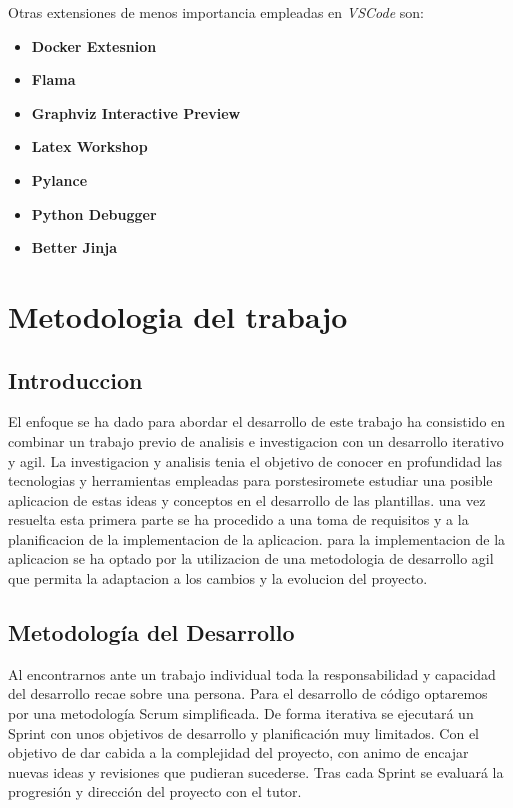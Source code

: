 \documentclass[12pt, a4paper, twoside]{article}
\begin{document}
Otras extensiones de menos importancia empleadas en \textit{VSCode} son:
\begin{itemize}
    \item \textbf{Docker Extesnion}
    \item \textbf{Flama}
    \item \textbf{Graphviz Interactive Preview}
    \item \textbf{Latex Workshop}
    \item \textbf{Pylance}
    \item \textbf{Python Debugger}
    \item \textbf{Better Jinja}
\end{itemize}





\section{Metodologia del trabajo}
\label{sec:Metodologia}
\subsection{Introduccion}
El enfoque se ha dado para abordar el desarrollo de este trabajo ha consistido en combinar un trabajo previo de analisis e investigacion con un desarrollo iterativo y agil.
La investigacion y analisis tenia el objetivo de conocer en profundidad las tecnologias y herramientas empleadas 
para porstesiromete estudiar una posible aplicacion de estas ideas y conceptos en el desarrollo de las plantillas.
una vez resuelta esta primera parte se ha procedido a una toma de requisitos y a la planificacion de la implementacion de la aplicacion.
para la implementacion de la aplicacion se ha optado por la utilizacion de una metodologia de desarrollo agil que permita la adaptacion a los cambios y la evolucion del proyecto.
\subsection{Metodología del Desarrollo}
Al encontrarnos ante un trabajo individual toda la responsabilidad y capacidad del desarrollo recae sobre una persona. 
Para el desarrollo de código optaremos por una metodología Scrum simplificada. De forma iterativa se ejecutará un Sprint con 
unos objetivos de desarrollo y planificación muy limitados. Con el objetivo de dar cabida a la complejidad del proyecto, 
con animo de encajar nuevas ideas y revisiones que pudieran sucederse.
Tras cada Sprint se evaluará la progresión y dirección del proyecto con el tutor.
\end{document}
